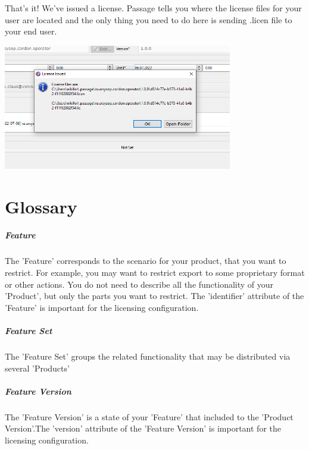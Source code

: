 \documentclass[12pt]{report}
\begin{document}
That's it! We've issued a license. Passage tells you where the license files for your user are located and the only thing you need to do here is sending .licen file to your end user.

\begin{center}
    \includegraphics[width=0.75\textwidth]{issue_completed}
\end{center}


\chapter*{Glossary}

\paragraph*{Feature}

The 'Feature' corresponds to the scenario for your product, that you want to restrict. For example, you may want to restrict export to some proprietary format or other actions. You do not need to describe all the functionality of your 'Product', but only the parts you want to restrict. The 'identifier' attribute of the 'Feature' is important for the licensing configuration.

\paragraph*{Feature Set}

The 'Feature Set' groups the related functionality that may be distributed via several 'Products'

\paragraph*{Feature Version}

The 'Feature Version' is a state of your 'Feature' that included to the 'Product Version'.The 'version' attribute of the 'Feature Version' is important for the licensing configuration.
\end{document}
